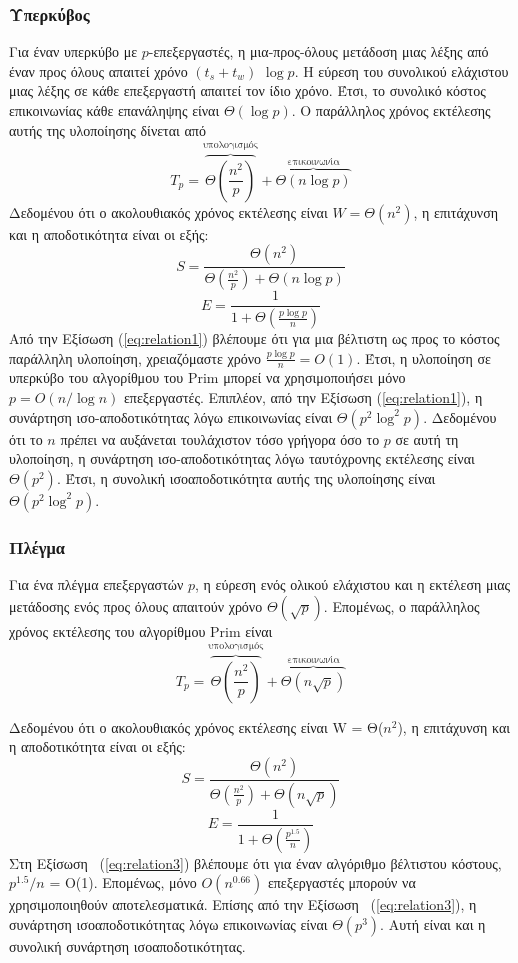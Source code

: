 \documentclass[12pt,a4paper]{article} %
\begin{document}
\subsubsection*{Υπερκύβος}
Για έναν υπερκύβο με $p$-επεξεργαστές, η μια-προς-όλους μετάδοση μιας λέξης από έναν προς όλους απαιτεί χρόνο
$(t_s + t_w)$ $\log p$. Η εύρεση του συνολικού ελάχιστου μιας λέξης σε κάθε
επεξεργαστή απαιτεί τον ίδιο χρόνο. Έτσι, το συνολικό κόστος επικοινωνίας
κάθε επανάληψης είναι $\Theta(\log p)$. Ο παράλληλος χρόνος εκτέλεσης αυτής της υλοποίησης δίνεται από 
\[
T_p =
\overbrace{\Theta\!\left(\frac{n^2}{p}\right)}^{\text{υπολογισμός}}
+
\overbrace{\Theta(n \log p)}^{\text{επικοινωνία}}
\]
Δεδομένου ότι ο ακολουθιακός χρόνος εκτέλεσης είναι $W = \Theta(n^2)$, η επιτάχυνση και η αποδοτικότητα είναι οι εξής:
\[ S = \frac{\Theta(n^2)}{\Theta\!\left(\frac{n^2}{p}\right) + \Theta(n \log p)} \]
\begin{equation}
E = \frac{1}{1 + \Theta\!\left(\frac{p \log p}{n}\right)}
\label{eq:relation1}
\end{equation}
Από την Εξίσωση (\ref{eq:relation1}) βλέπουμε ότι για μια βέλτιστη ως προς το κόστος παράλληλη υλοποίηση, χρειαζόμαστε χρόνο \(\frac{p \log p}{n} = O(1)\). Έτσι, η υλοποίηση σε υπερκύβο του αλγορίθμου του Prim μπορεί να χρησιμοποιήσει μόνο \( p = O(n / \log n) \) επεξεργαστές. Επιπλέον, από την Εξίσωση (\ref{eq:relation1}), η συνάρτηση ισο-αποδοτικότητας λόγω
επικοινωνίας είναι $\Theta(p^2 \log^2 p)$. Δεδομένου ότι το $n$ πρέπει να αυξάνεται τουλάχιστον τόσο γρήγορα όσο το $p$ σε αυτή τη
υλοποίηση, η συνάρτηση ισο-αποδοτικότητας λόγω ταυτόχρονης εκτέλεσης είναι $\Theta(p^2)$. Έτσι, η συνολική
ισοαποδοτικότητα αυτής της υλοποίησης είναι $\Theta(p^2 \log^2 p)$.

\vspace{0.3cm}
\subsubsection*{Πλέγμα}
Για ένα πλέγμα επεξεργαστών $p$, η εύρεση ενός ολικού ελάχιστου και η εκτέλεση μιας μετάδοσης ενός προς όλους απαιτούν χρόνο $\Theta(\sqrt{p})$. Επομένως, ο παράλληλος χρόνος εκτέλεσης του αλγορίθμου Prim είναι 
\begin{equation}
T_p = \overbrace{\Theta\!\left(\frac{n^2}{p}\right)}^{\text{υπολογισμός}}
+ \overbrace{\Theta(n \sqrt{p})}^{\text{επικοινωνία}}
\label{eq:relation2}
\end{equation}

Δεδομένου ότι ο ακολουθιακός χρόνος εκτέλεσης είναι W = Θ($n^2$), η επιτάχυνση και η αποδοτικότητα είναι οι εξής:
\[
S = \frac{\Theta(n^2)}{\Theta\!\left(\frac{n^2}{p}\right) + \Theta(n\sqrt{p})}
\]
\begin{equation}
E = \frac{1}{1 + \Theta\!\left(\frac{p^{1.5}}{n}\right)}
\label{eq:relation3}
\end{equation}
Στη Εξίσωση ~(\ref{eq:relation3}) βλέπουμε ότι για έναν αλγόριθμο βέλτιστου κόστους, $p^{1.5}/n$ = O(1). Επομένως, μόνο $O(n^{0.66})$ επεξεργαστές μπορούν να χρησιμοποιηθούν αποτελεσματικά. Επίσης από την Εξίσωση ~(\ref{eq:relation3}), η συνάρτηση ισοαποδοτικότητας λόγω επικοινωνίας είναι $\Theta(p^3)$. Αυτή είναι και η συνολική συνάρτηση ισοαποδοτικότητας. 
\vspace{0.5cm}
\end{document}
